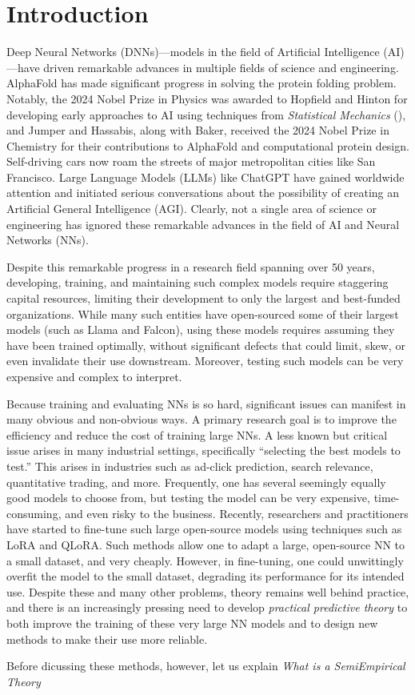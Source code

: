 
\section{Introduction}
\label{sxn:intro}
Deep Neural Networks (DNNs)—models in the field of Artificial Intelligence (AI)—have driven remarkable advances in multiple fields of science and engineering. AlphaFold has made significant progress in solving the protein folding problem.\cite{AlphaFold} Notably, the 2024 Nobel Prize in Physics was awarded to Hopfield and Hinton for developing early approaches to AI using techniques from \emph{Statistical Mechanics} (\STATMECH), and Jumper and Hassabis, along with Baker, received the 2024 Nobel Prize in Chemistry for their contributions to AlphaFold and computational protein design.\cite{Nobel2024Physics, Nobel2024Chemistry} Self-driving cars now roam the streets of major metropolitan cities like San Francisco. Large Language Models (LLMs) like ChatGPT have gained worldwide attention and initiated serious conversations about the possibility of creating an Artificial General Intelligence (AGI). Clearly, not a single area of science or engineering has ignored these remarkable advances in the field of AI and Neural Networks (NNs).

Despite this remarkable progress in a research field spanning over 50 years, developing, training, and maintaining such complex models require staggering capital resources, limiting their development to only the largest and best-funded organizations. While many such entities have open-sourced some of their largest models (such as Llama and Falcon), using these models requires assuming they have been trained optimally, without significant defects that could limit, skew, or even invalidate their use downstream. Moreover, testing such models can be very expensive and complex to interpret.

Because training and evaluating NNs is so hard, significant issues can manifest in many obvious and non-obvious ways. A primary research goal is to improve the efficiency and reduce the cost of training large NNs. A less known but critical issue arises in many industrial settings, specifically “selecting the best models to test.” This arises in industries such as ad-click prediction, search relevance, quantitative trading, and more. Frequently, one has several seemingly equally good models to choose from, but testing the model can be very expensive, time-consuming, and even risky to the business. Recently, researchers and practitioners have started to fine-tune such large open-source models using techniques such as LoRA and QLoRA. Such methods allow one to adapt a large, open-source NN to a small dataset, and very cheaply. However, in fine-tuning, one could unwittingly overfit the model to the small dataset, degrading its performance for its intended use. Despite these and many other problems, theory remains well behind practice, and there is an increasingly pressing need to develop \emph{practical predictive theory} to both improve the training of these very large NN models and to design new methods to make their use more reliable.

Before dicussing these methods, however, let us explain \emph{What is a SemiEmpirical Theory}





%

